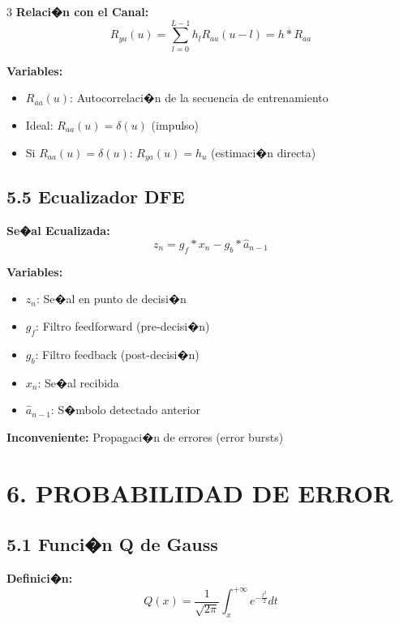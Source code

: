 ﻿\documentclass[8pt,a4paper]{article}
\begin{document}
\begin{multicols}{3}
\textbf{Relaci�n con el Canal:}
\[
R_{ya}(u) = \sum_{l=0}^{L-1} h_l R_{aa}(u-l) = h * R_{aa}
\]

\textbf{Variables:}
\begin{itemize}[leftmargin=*,itemsep=0pt]
    \item $R_{aa}(u)$: Autocorrelaci�n de la secuencia de entrenamiento
    \item Ideal: $R_{aa}(u) = \delta(u)$ (impulso)
    \item Si $R_{aa}(u) = \delta(u)$: $R_{ya}(u) = h_u$ (estimaci�n directa)
\end{itemize}

\vspace{-2mm}
\subsection*{\small 5.5 Ecualizador DFE}
\vspace{-2mm}

\textbf{Se�al Ecualizada:}
\[
z_n = g_f * x_n - g_b * \hat{a}_{n-1}
\]

\textbf{Variables:}
\begin{itemize}[leftmargin=*,itemsep=0pt]
    \item $z_n$: Se�al en punto de decisi�n
    \item $g_f$: Filtro feedforward (pre-decisi�n)
    \item $g_b$: Filtro feedback (post-decisi�n)
    \item $x_n$: Se�al recibida
    \item $\hat{a}_{n-1}$: S�mbolo detectado anterior
\end{itemize}

\textbf{Inconveniente:} Propagaci�n de errores (error bursts)

\vspace{-2mm}
\section*{\color{sectioncolor}\normalsize 6. PROBABILIDAD DE ERROR}
\vspace{-3mm}

\subsection*{\small 5.1 Funci�n Q de Gauss}
\vspace{-2mm}

\textbf{Definici�n:}
\[
Q(x) = \frac{1}{\sqrt{2\pi}} \int_x^{+\infty} e^{-\frac{t^2}{2}} dt
\]


\end{multicols}
\end{document}
